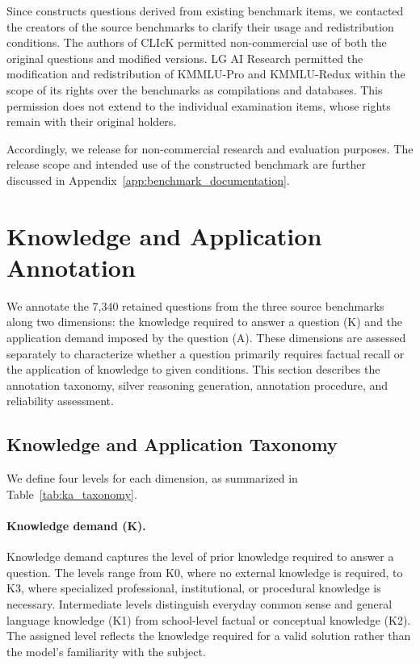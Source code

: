 Since \name{} constructs questions derived from existing benchmark items, we contacted the creators of the source benchmarks to clarify their usage and redistribution conditions.
The authors of CLIcK permitted non-commercial use of both the original questions and modified versions.
LG AI Research permitted the modification and redistribution of KMMLU-Pro and KMMLU-Redux within the scope of its rights over the benchmarks as compilations and databases.
This permission does not extend to the individual examination items, whose rights remain with their original holders.

Accordingly, we release \name{} for non-commercial research and evaluation purposes.
The release scope and intended use of the constructed benchmark are further discussed in Appendix~\ref{app:benchmark_documentation}.



\section{Knowledge and Application Annotation}
\label{app:ka_annotation}

We annotate the 7,340 retained questions from the three source benchmarks along two dimensions: the knowledge required to answer a question (K) and the application demand imposed by the question (A).
These dimensions are assessed separately to characterize whether a question primarily requires factual recall or the application of knowledge to given conditions.
This section describes the annotation taxonomy, silver reasoning generation, annotation procedure, and reliability assessment.

\subsection{Knowledge and Application Taxonomy}

We define four levels for each dimension, as summarized in Table~\ref{tab:ka_taxonomy}.



\paragraph{Knowledge demand (K).}
Knowledge demand captures the level of prior knowledge required to answer a question.
The levels range from K0, where no external knowledge is required, to K3, where specialized professional, institutional, or procedural knowledge is necessary.
Intermediate levels distinguish everyday common sense and general language knowledge (K1) from school-level factual or conceptual knowledge (K2).
The assigned level reflects the knowledge required for a valid solution rather than the model's familiarity with the subject.

